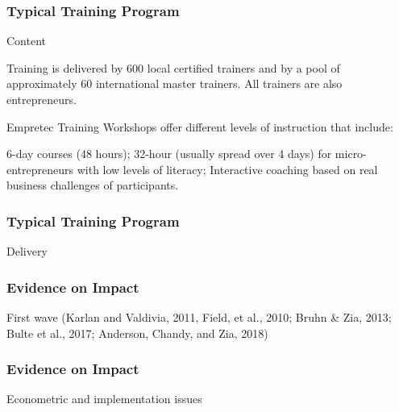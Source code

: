 \documentclass[hideothersubsections, usenames,dvipsnames,10pt]{beamer}
\newenvironment{itemize_3pt}{\itemize\addtolength{\itemsep}{3pt}}{\enditemize}
\begin{document}

\begin{frame}
\frametitle{Typical Training Program}
	Content
	\begin{itemize_3pt}
	\item Training is delivered by 600 local certified trainers and by a pool of approximately 60 international master trainers. All trainers are also entrepreneurs.
	\item Empretec Training Workshops offer different levels of instruction that include:
	\item 6-day courses (48 hours); 32-hour (usually spread over 4 days) for micro-entrepreneurs with low levels of literacy; Interactive coaching based on real business challenges of participants.
	\vspace{0.1in}
	\end{itemize_3pt}
\end{frame}

\begin{frame}
\frametitle{Typical Training Program}
	Delivery
	\begin{itemize_3pt}
	\item %
	\vspace{0.1in}
	\end{itemize_3pt}
\end{frame}


\begin{frame}
\frametitle{Evidence on Impact}
	\begin{itemize_3pt}
	\item First wave (Karlan and Valdivia, 2011, Field, et al., 2010; Bruhn \& Zia, 2013; Bulte et al., 2017; Anderson, Chandy, and Zia, 2018)
					 \citep{Karlan2011} \citep{Field2010} \citep{Bruhn2013} \citep{Bulte2017} \citep{Anderson2018}
	\vspace{0.1in}
	\end{itemize_3pt}
\end{frame}

\begin{frame}
\frametitle{Evidence on Impact}
	\begin{itemize_3pt}
	\item Econometric and implementation issues \citep{McKenzie2014}
	\vspace{0.1in}
	\end{itemize_3pt}
\end{frame}
\end{document}
